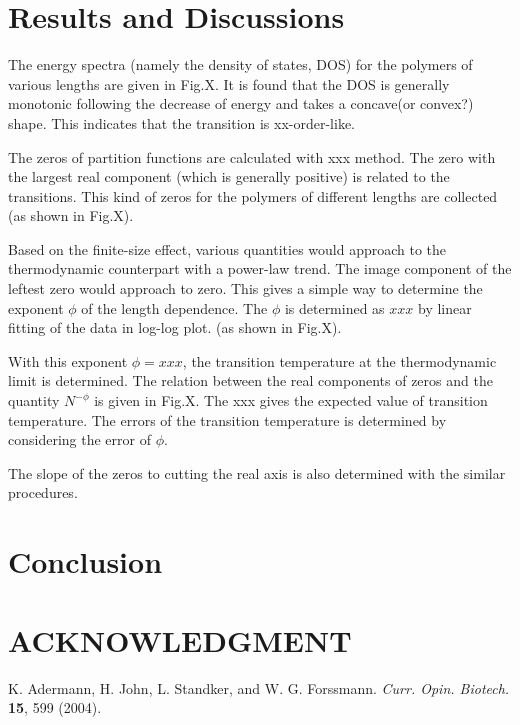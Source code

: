 \documentclass[preprint,preprintnumbers,amsmath,amssymb,showpacs,pre]{revtex4-1}
\begin{document}
\section{Results and Discussions}

The energy spectra (namely the density of states, DOS) for the polymers of
various lengths are given in Fig.X.
It is found that the DOS is generally monotonic following the decrease of
energy and takes a concave(or convex?) shape. This indicates that the
transition is xx-order-like.

The zeros of partition functions are calculated with xxx method. The zero
with the largest real component (which is generally positive) is related to
the transitions. This kind of zeros for the polymers of different lengths
are collected (as shown in Fig.X).

Based on the finite-size effect, various quantities would approach to the
thermodynamic counterpart with a power-law trend. The image component of
the leftest zero would approach to zero. This gives a simple way to
determine the exponent $\phi$ of the length dependence. The $\phi$ is
determined as $xxx$ by linear fitting of the data in log-log plot. (as
shown in Fig.X).

With this exponent $\phi=xxx$, the transition temperature at the
thermodynamic limit is determined. The relation between the real
components of zeros and the quantity $N^{-\phi}$ is given in Fig.X.
The xxx gives the expected value of transition temperature. The
errors of the transition temperature is determined by considering
the error of $\phi$.

The slope of the zeros to cutting the real axis is also determined
with the similar procedures.

\section{Conclusion}

\section*{ACKNOWLEDGMENT}

\begin{thebibliography}{10}

K. Adermann, H. John, L. Standker, and W. G. Forssmann.
{\it Curr. Opin. Biotech.} {\bf 15}, 599 (2004).

\end{thebibliography}
\end{document}
